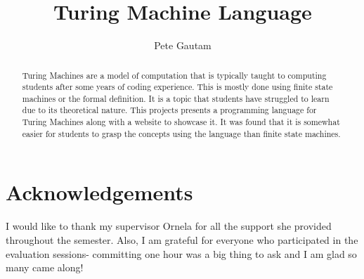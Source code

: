\documentclass{l4proj}
\begin{document}
\title{Turing Machine Language} 
\author{Pete Gautam}

\maketitle

\begin{abstract}
Turing Machines are a model of computation that is typically taught to computing students after some years of coding experience. This is mostly done using finite state machines or the formal definition. It is a topic that students have struggled to learn due to its theoretical nature. This projects presents a programming language for Turing Machines along with a website to showcase it. It was found that it is somewhat easier for students to grasp the concepts using the language than finite state machines.
\end{abstract}

\chapter*{Acknowledgements}

I would like to thank my supervisor Ornela for all the support she provided throughout the semester. Also, I am grateful for everyone who participated in the evaluation sessions- committing one hour was a big thing to ask and I am glad so many came along!

\def\consentname {Pete Gautam} 
\def\consentdate {20 March 2023} 
\educationalconsent

\tableofcontents







  



\renewcommand{\thechapter}{0} 


\listoffigures
\end{document}
